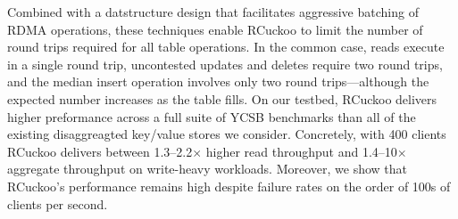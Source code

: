 
Combined with a datstructure design that facilitates aggressive
batching of RDMA operations, these techniques enable RCuckoo to limit
the number of round trips required for all table operations.  In the
common case, reads execute in a single round trip, uncontested updates
and deletes require two round trips, and the median insert operation
involves only two round trips---although the expected number increases
as the table fills.  On our testbed, RCuckoo delivers higher
preformance across a full suite of YCSB benchmarks than all of the
existing disaggreagted key/value stores we consider.  Concretely, with
400 clients RCuckoo delivers between 1.3--2.2$\times$ higher read
throughput and 1.4--10$\times$ aggregate throughput on write-heavy
workloads.  Moreover, we show that RCuckoo's performance remains high
despite failure rates on the order of 100s of clients per second.
